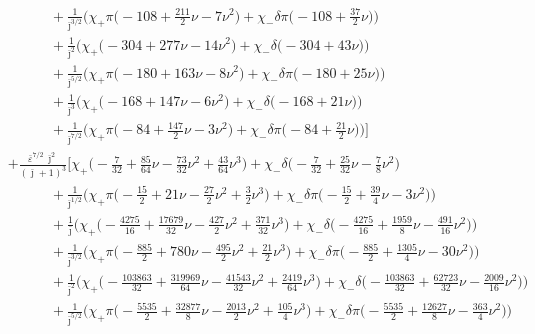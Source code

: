 \documentclass[prd,superscriptaddress,preprintnumbers,tightenlines,nofootinbib, eqsecnum]{revtex4-2}
\newcommand{\nn}{\nonumber}
\begin{document}
\begin{align}
&\qquad\quad + \frac{1}{\bar{\jmath}^{3/2}}\Bigg(\chi_{+}\pi\bigg(-108 + \frac{211}{2}\nu - 7 \nu^{2}\bigg) + \chi_{-}\delta\pi\bigg(-108 + \frac{37}{2}\nu\bigg)\Bigg) \nn \\
&\qquad\quad + \frac{1}{\bar{\jmath}^{2}}\Bigg(\chi_{+}\bigg(-304 + 277 \nu - 14 \nu^{2}\bigg) + \chi_{-}\delta\bigg(-304 + 43 \nu\bigg)\Bigg) \nn \\
&\qquad\quad + \frac{1}{\bar{\jmath}^{5/2}}\Bigg(\chi_{+}\pi\bigg(-180 + 163 \nu - 8 \nu^{2}\bigg) + \chi_{-}\delta\pi\bigg(-180 + 25 \nu\bigg)\Bigg) \nn \\
&\qquad\quad + \frac{1}{\bar{\jmath}^{3}}\Bigg(\chi_{+}\bigg(-168 + 147 \nu - 6 \nu^{2}\bigg) + \chi_{-}\delta\bigg(-168 + 21 \nu\bigg)\Bigg) \nn \\
&\qquad\quad + \frac{1}{\bar{\jmath}^{7/2}}\Bigg(\chi_{+}\pi\bigg(-84 + \frac{147}{2}\nu - 3 \nu^{2}\bigg) + \chi_{-}\delta\pi\bigg(-84 + \frac{21}{2}\nu\bigg)\Bigg)\Bigg] \nn \\
&+ \frac{\bar{\varepsilon}^{7/2}\,\bar{\jmath}^{2}}{(\bar{\jmath}+1)^{3}}\Bigg[
\chi_{+}\bigg(-\frac{7}{32} + \frac{85}{64}\nu - \frac{73}{32}\nu^{2} + \frac{43}{64}\nu^{3}\bigg) + \chi_{-}\delta\bigg(-\frac{7}{32} + \frac{25}{32}\nu - \frac{7}{8}\nu^{2}\bigg) \nn \\
&\qquad\quad + \frac{1}{\bar{\jmath}^{1/2}}\Bigg(\chi_{+}\pi\bigg(-\frac{15}{2} + 21 \nu - \frac{27}{2}\nu^{2} + \frac{3}{2}\nu^{3}\bigg) + \chi_{-}\delta\pi\bigg(-\frac{15}{2} + \frac{39}{4}\nu - 3 \nu^{2}\bigg)\Bigg) \nn \\
&\qquad\quad + \frac{1}{\bar{\jmath}}\Bigg(\chi_{+}\bigg(-\frac{4275}{16} + \frac{17679}{32}\nu - \frac{427}{2}\nu^{2} + \frac{371}{32}\nu^{3}\bigg) + \chi_{-}\delta\bigg(-\frac{4275}{16} + \frac{1959}{8}\nu - \frac{491}{16}\nu^{2}\bigg)\Bigg) \nn \\
&\qquad\quad + \frac{1}{\bar{\jmath}^{3/2}}\Bigg(\chi_{+}\pi\bigg(-\frac{885}{2} + 780 \nu - \frac{495}{2}\nu^{2} + \frac{21}{2}\nu^{3}\bigg) + \chi_{-}\delta\pi\bigg(-\frac{885}{2} + \frac{1305}{4}\nu - 30 \nu^{2}\bigg)\Bigg) \nn \\
&\qquad\quad + \frac{1}{\bar{\jmath}^{2}}\Bigg(\chi_{+}\bigg(-\frac{103863}{32} + \frac{319969}{64}\nu - \frac{41543}{32}\nu^{2} + \frac{2419}{64}\nu^{3}\bigg) + \chi_{-}\delta\bigg(-\frac{103863}{32} + \frac{62723}{32}\nu - \frac{2009}{16}\nu^{2}\bigg)\Bigg) \nn \\
&\qquad\quad + \frac{1}{\bar{\jmath}^{5/2}}\Bigg(\chi_{+}\pi\bigg(-\frac{5535}{2} + \frac{32877}{8}\nu - \frac{2013}{2}\nu^{2} + \frac{105}{4}\nu^{3}\bigg) + \chi_{-}\delta\pi\bigg(-\frac{5535}{2} + \frac{12627}{8}\nu - \frac{363}{4}\nu^{2}\bigg)\Bigg) \nn \\

\end{align}
\end{document}
